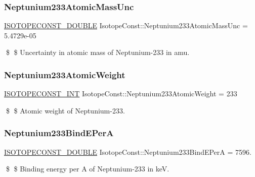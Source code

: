 \subsubsection{\texorpdfstring{Neptunium233\+Atomic\+Mass\+Unc}{Neptunium233AtomicMassUnc}}
{\footnotesize\ttfamily \mbox{\hyperlink{group___isotope_const-_macros_ga8f45a7272ce02c0b4c65c44636ed719a}{I\+S\+O\+T\+O\+P\+E\+C\+O\+N\+S\+T\+\_\+\+D\+O\+U\+B\+LE}} Isotope\+Const\+::\+Neptunium233\+Atomic\+Mass\+Unc = 5.\+4729e-\/05}

\$ \$ Uncertainty in atomic mass of Neptunium-\/233 in amu. \mbox{\label{group___isotope_const-_neptunium-_np233_ga83dc204aecae69787bb43fd3e2e06b7b}} 
\subsubsection{\texorpdfstring{Neptunium233\+Atomic\+Weight}{Neptunium233AtomicWeight}}
{\footnotesize\ttfamily \mbox{\hyperlink{group___isotope_const-_macros_ga5f18360b3e99483a35c32d789e62621c}{I\+S\+O\+T\+O\+P\+E\+C\+O\+N\+S\+T\+\_\+\+I\+NT}} Isotope\+Const\+::\+Neptunium233\+Atomic\+Weight = 233}

\$ \$ Atomic weight of Neptunium-\/233. \mbox{\label{group___isotope_const-_neptunium-_np233_ga0d3f90053f0d17d57c5122946eba175e}} 
\subsubsection{\texorpdfstring{Neptunium233\+Bind\+E\+PerA}{Neptunium233BindEPerA}}
{\footnotesize\ttfamily \mbox{\hyperlink{group___isotope_const-_macros_ga8f45a7272ce02c0b4c65c44636ed719a}{I\+S\+O\+T\+O\+P\+E\+C\+O\+N\+S\+T\+\_\+\+D\+O\+U\+B\+LE}} Isotope\+Const\+::\+Neptunium233\+Bind\+E\+PerA = 7596.}

\$ \$ Binding energy per A of Neptunium-\/233 in keV. \mbox{\label{group___isotope_const-_neptunium-_np233_ga2cd3a6b1b0f2f06bb1b0f93da2a3785b}} 
